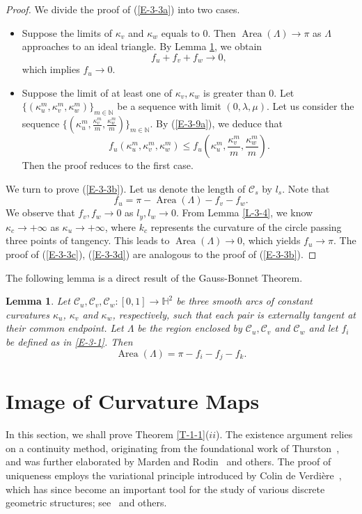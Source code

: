 \documentclass[11pt,leqno]{article}
\numberwithin{equation}{section}
\DeclareMathOperator{\area}{Area}
\newtheorem{lemma}[theorem]{Lemma}
\theoremstyle{definition}
\begin{document}
\begin{proof}
We divide the proof of (\ref{E-3-3a}) into two cases.
\begin{itemize}
\item[($i$)] Suppose the limits of $\kappa_v$ and $\kappa_w$ equals to $0$.
Then $\area(\Lambda)\to\pi$ as $\Lambda$ approaches to an ideal triangle. By Lemma \ref{L-3-7}, we obtain \[f_u+f_v+f_w\to0,\]
which implies $f_u\to0$.
\item[($ii$)] Suppose the limit of at least one of $\kappa_v,\kappa_w$ is greater than $0$. Let $\{(\kappa_u^m,\kappa_v^m,\kappa_w^m)\}_{m\in\mathbb{N}}$ be a sequence with limit $(0,\lambda,\mu)$. Let us consider the sequence $\{(\kappa_u^m,\frac{\kappa_v^m}{m},\frac{\kappa_w^m}{m})\}_{m\in\mathbb{N}}$. By (\ref{E-3-9a}), we deduce that
\[
f_u(\kappa_u^m,\kappa_v^m,\kappa_w^m)\leq f_u(\kappa_u^m,\frac{\kappa_v^m}{m},\frac{\kappa_w^m}{m}).
\]
Then the proof reduces to the first case.
\end{itemize}
We turn to prove (\ref{E-3-3b}).
Let us denote the length of $\mathcal C_s$ by $l_s$. Note that
\[f_u=\pi-\area(\Lambda)-f_v-f_w.\]
We observe that $f_v,f_w\to 0$ as $l_y,l_w\to0$. From Lemma \ref{L-3-4}, we know $\kappa_c\to+\infty$ as $\kappa_u\to+\infty$, where $k_c$ represents the curvature of the circle passing three points of tangency. This leads to $\area(\Lambda)\to0$, which yields $f_u\to\pi$. The proof of (\ref{E-3-3c}), (\ref{E-3-3d}) are analogous to the proof of (\ref{E-3-3b}).





\end{proof}
The following lemma is a direct result of the Gauss-Bonnet Theorem.
\begin{lemma}\label{L-3-7}
Let $\mathcal C_u,\mathcal C_v,\mathcal C_w: [0,1]\to\mathbb{H}^2$ be three smooth arcs of constant curvatures $\kappa_u$, $\kappa_v$ and $\kappa_w$, respectively, such that each pair is externally tangent at their common endpoint. Let $\Lambda$ be the region enclosed by $\mathcal C_u,\mathcal C_v$ and $\mathcal C_w$ and let $f_i$ be defined as in \eqref{E-3-1}. Then
\[\area(\Lambda)=\pi-f_i-f_j-f_k.\]
\end{lemma}

\section{Image of Curvature Maps}
In this section, we shall prove Theorem \ref{T-1-1}($ii$).
The existence argument relies on a continuity method, originating from the foundational work of Thurston~\cite{MR1435975},  and was further elaborated by Marden and Rodin~\cite{MR1071766} and others.
The proof of uniqueness employs the variational principle introduced by Colin de Verdi\`ere~\cite{MR1106755}, which has since become an important tool for the study of various discrete geometric structures; see~\cite{MR2233848,MR2788656,MR2862158} and others.
\end{document}
